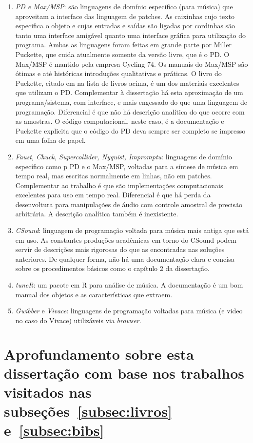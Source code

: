 \begin{enumerate}
    \item \emph{PD e Max/MSP}: são linguagens de domínio específico (para música) que aproveitam a interface das linguagem de patches. As caixinhas cujo texto especifica o objeto e cujas entradas e saídas são ligadas por cordinhas são tanto uma interface amigável quanto uma interface gráfica para utilização do programa. Ambas as linguagens foram feitas em grande parte por Miller Puckette, que cuida atualmente somente da versão livre, que é o PD. O Max/MSP é mantido pela empresa Cycling 74. Os manuais do Max/MSP são ótimas e até históricas introduções qualitativas e práticas. O livro do Puckette, citado em na lista de livros acima, é um dos materiais excelentes que utilizam o PD. Complementar à dissertação há esta aproximação de um programa/sistema, com interface, e mais engessado do que uma linguagem de programação. Diferencial é que não há descrição analítica do que ocorre com as amostras. O código computacional, neste caso, é a documentação e Puckette explicita que o código do PD deva sempre ser completo se impresso em uma folha de papel.
    \item \emph{Faust, Chuck, Supercollider, Nyquist, Impromptu}: linguagens de domínio específico como p PD e o Max/MSP, voltadas para a síntese de música em tempo real, mas escritas normalmente em linhas, não em patches. Complementar ao trabalho é que são implementações computacionais excelentes para uso em tempo real. Diferencial é que há perda da desenvoltura para manipulações de áudio com controle amostral de precisão arbitrária. A descrição analítica também é inexistente. 
    \item \emph{CSound}: linguagem de programação voltada para música mais antiga que está em uso. As constantes produções acadêmicas em torno do CSound podem servir de descrições mais rigorosas do que as encontradas nas soluções anteriores. De qualquer forma, não há uma documentação clara e concisa sobre os procedimentos básicos como o capítulo 2 da dissertação. 
    \item \emph{tuneR}: um pacote em R para análise de música. A documentação é um bom manual dos objetos e as características que extraem. 
    \item \emph{Gwibber} e \emph{Vivace}: linguagens de programação voltadas para música (e video no caso do Vivace) utilizáveis via \emph{browser}.
\end{enumerate}


\section{Aprofundamento sobre esta dissertação com base nos trabalhos visitados nas subseções~\ref{subsec:livros} e~\ref{subsec:bibs}}

